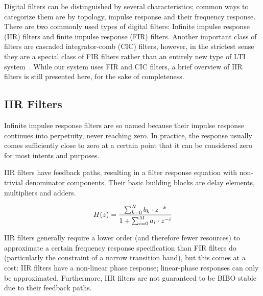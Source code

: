 Digital filters can  be distinguished by several  characteristics; common ways
to  categorize them  are by  topology,  impulse response  and their  frequency
response. There  are  two commonly  used  types  of digital  filters: Infinite
impulse   response   (IIR)  filters   and   finite   impulse  response   (FIR)
filters. Another important class of filters are cascaded integrator-comb (CIC)
filters,  however, in  the strictest  sense they  are a  special class  of FIR
filters rather than an entirely new  type of LTI system~\cite{1163535}.  While
our system uses FIR and CIC filters,  a brief overview of IIR filters is still
presented here, for the sake of completeness.
%
%
\subsection{IIR Filters} %
\label{subsec:iir_filters}

Infinite impulse response filters are  so named because their impulse response
continues  into perpetuity,  never  reaching zero. In  practice, the  response
usually comes  sufficiently close to  zero at a certain  point that it  can be
considered zero for most intents and purposes.

IIR filters have feedback paths, resulting  in a filter response equation with
non-trivial  denominator components. Their  basic  building  blocks are  delay
elements, multipliers and adders.

\begin{equation}
    \label{eq:iir_filter}
    H(z) = \frac{%
            \sum_{k=0}^N b_k \cdot z^{-k}}{%
            1 + \sum_{i=0}^M a_i \cdot z^{-i}}
\end{equation}

IIR filters generally require a lower order (and therefore fewer resources) to
approximate a  certain frequency  response specification  than FIR  filters do
(particularly the constraint of a narrow transition band), but this comes at a
cost:  IIR  filters have a  non-linear phase response;  linear-phase responses
can only  be approximated. Furthermore, IIR  filters are not guaranteed  to be
BIBO stable due to their feedback paths.

